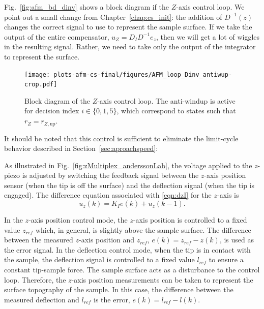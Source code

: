 \documentclass[twocolumn,twoside]{IEEEtran/IEEEtran}
\begin{document}
Fig.~\ref{fig:afm_bd_dinv} shows a block diagram if the $Z$-axis control loop.
We point out a small change from Chapter~\ref{chap:cs_init}: the addition of
$D^{-1}(z)$ changes the correct signal to use to represent the sample surface.
If we take the output of the entire compensator, $u_Z=D_ID^{-1}e_z$, then we
will get a lot of wiggles in the resulting signal. Rather, we need to take only
the output of the integrator to represent the surface.
\begin{figure}[t]
  \centering
  \texttt{[image: plots-afm-cs-final/figures/AFM\_loop\_Dinv\_antiwup-crop.pdf]}
  \caption{Block diagram of the $Z$-axis control loop. The anti-windup is active
    for decision index $i\in\{0,1,5\}$, which correspond to states such that
    $r_Z=r_{Z,\textrm{up}}$.}
  \label{fig:afm_bd_dinv_final}
\end{figure}


It should be noted that this control is sufficient to eliminate the limit-cycle
behavior described in Section~\ref{sec:aproachspeed}:

	
As illustrated in Fig.~\ref{fig:zMultiplex_anderssonLab}, the voltage applied to
the $z$-piezo is adjusted by switching the feedback signal between the $z$-axis
position sensor (when the tip is off the surface) and the deflection signal
(when the tip is engaged). The difference equation associated with
\eqref{eqn:dzI} for the $z$-axis is
\begin{equation}
  u_z(k) = K_Ie(k) + u_z(k-1).
  \label{eqn:intdiff}
\end{equation}

In the $z$-axis position control mode, the $z$-axis position is controlled to a
fixed value $z_{ref}$ which, in general, is slightly above the sample surface.
The difference between the measured $z$-axis position and $z_{ref}$,
${e(k) = z_{ref} - z(k)}$, is used as the error signal. In the deflection
control mode, when the tip is in contact with the sample, the deflection signal
is controlled to a fixed value $l_{ref}$ to ensure a constant tip-sample force.
The sample surface acts as a disturbance to the control loop. Therefore, the
$z$-axis position measurements can be taken to represent the surface topography
of the sample. In this case, the difference between the measured deflection and
$l_{ref}$ is the error, $e(k) = l_{ref} - l(k)$.
	
\end{document}
